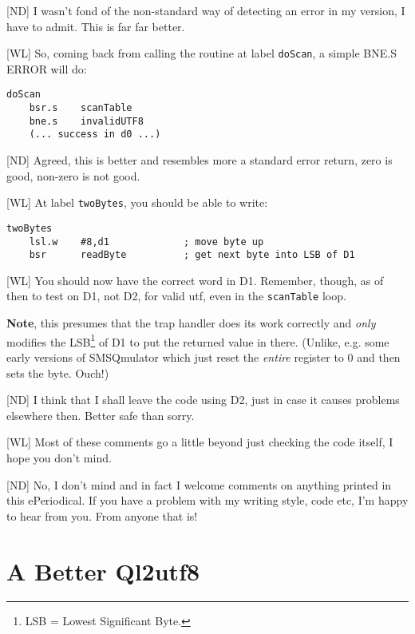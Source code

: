 [ND] I wasn't fond of the non-standard way of detecting an error in my version, I have to admit. This is far far better.

[WL] So, coming back from calling the routine at label \texttt{doScan}, a simple BNE.S ERROR will do:
	
\begin{lstlisting}[numbers=none]	
  doScan   
    bsr.s    scanTable
    bne.s    invalidUTF8
    (... success in d0 ...)
\end{lstlisting}

[ND] Agreed, this is better and resembles more a standard error return, zero is good, non-zero is not good.

[WL] At label \texttt{twoBytes}, you should be able to write:

\begin{lstlisting}[numbers=none]
  twoBytes
    lsl.w    #8,d1             ; move byte up
    bsr      readByte          ; get next byte into LSB of D1
\end{lstlisting}
	
[WL] You should now have the correct word in D1. Remember, though, as of then to test on D1, not D2, for valid utf, even in the \texttt{scanTable} loop.

\textbf{Note}, this presumes that the trap handler does its work correctly and \emph{only} modifies the LSB\footnote{LSB = Lowest Significant Byte.} of D1 to put the returned value in there. (Unlike, e.g. some early versions of SMSQmulator which just reset the \emph{entire} register to 0 and then sets the byte. Ouch!)

[ND] I think that I shall leave the code using D2, just in case it causes problems elsewhere then. Better safe than sorry.
	
[WL] Most of these comments go a little beyond just checking the code itself, I hope you don't mind.

[ND] No, I don't mind and in fact I welcome comments on anything printed in this ePeriodical. If you have a problem with my writing style, code etc, I'm happy to hear from you. From anyone that is!

\section{A Better Ql2utf8}

